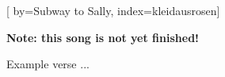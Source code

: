 

[%
    by={Subway to Sally},
    index={kleidausrosen}]


    \label{kleidausrosen}

    \textbf{Note: this song is not yet finished!}

    \beginverse
        Example verse ...
    \endverse
\endsong
